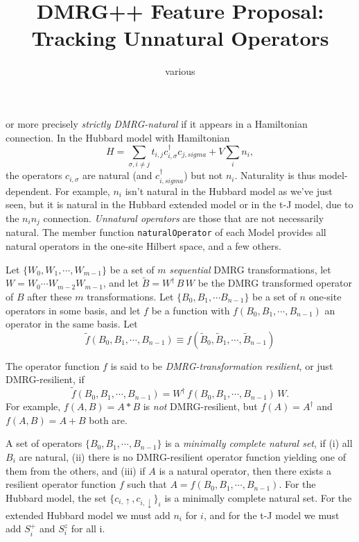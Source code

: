 \documentclass{article}
\begin{document}
\title{DMRG++ Feature Proposal:\\
Tracking Unnatural Operators}
\author{various}
\maketitle

 or
more precisely \emph{strictly DMRG-natural}
if it appears in a Hamiltonian connection. In the Hubbard model
with Hamiltonian
\begin{equation}
H=\sum_{\sigma, i\neq j}t_{i,j} c^\dagger_{i,\sigma} c_{j,sigma} + V\sum_i n_i,
\end{equation}
the operators $c_{i,\sigma}$ are natural (and $c^\dagger_{i,sigma}$) 
but not $n_i$.
Naturality is thus model-dependent.
For example, $n_i$ isn't natural in the Hubbard model as we've just
seen, but it is natural
in the Hubbard extended model or in the t-J model, due to the $n_i n_j$ connection.
\emph{Unnatural operators} are those that are not necessarily natural.
 The member function \texttt{naturalOperator}
of each Model provides all natural operators
in the one-site Hilbert space, and a few others.

Let $\{W_0, W_1, \cdots, W_{m-1}\}$ be a set of $m$ \emph{sequential} DMRG 
 transformations, let
 $W =W_0\cdots W_{m-2} W_{m-1}$,  and let 
 $\tilde{B} =   W^\dagger\, B\, W$ be
 the DMRG transformed operator of $B$ after these $m$ transformations.
Let $\{B_0, B_1, \cdots B_{n-1}\}$ be a set
of $n$ one-site operators in some basis, and let $f$ be a function with
$f(B_0, B_1, \cdots, B_{n-1})$ an operator in the same basis.
Let 
\begin{equation}
\tilde{f}(B_0, B_1, \cdots, B_{n-1}) \equiv 
f(\tilde{B}_0, \tilde{B}_1, \cdots, \tilde{B}_{n-1})
\end{equation}

The operator function $f$ is said to be \emph{DMRG-transformation resilient},
or just DMRG-resilient, if 
\begin{equation}
\tilde{f}(B_0, B_1, \cdots, B_{n-1}) = W^\dagger\, f(B_0, B_1, \cdots, B_{n-1})\, W.
\end{equation}
For example, $f(A,B) = A*B$ is \emph{not} DMRG-resilient,
but  $f(A) = A^\dagger$ and
$f(A,B) = A + B$ both are.

A set of operators $\{B_0, B_1, \cdots, B_{n-1}\}$ is a \emph{minimally complete
natural set}, if (i) all $B_i$ are natural, (ii) there is no DMRG-resilient operator
function yielding one of them from the others, and (iii) if $A$ is a 
natural operator, then there exists 
a resilient operator function $f$ such that
$A = f(B_0, B_1, \cdots, B_{n-1})$.
For the Hubbard model, the set $\{c_{i, \uparrow}, c_{i, \downarrow}\}_i$ is 
a minimally complete natural set. For the extended Hubbard model we must
add $n_i$ for $i$, and for the t-J model we must add $S^+_i$ and $S^z_i$ for all i.
\end{document}
